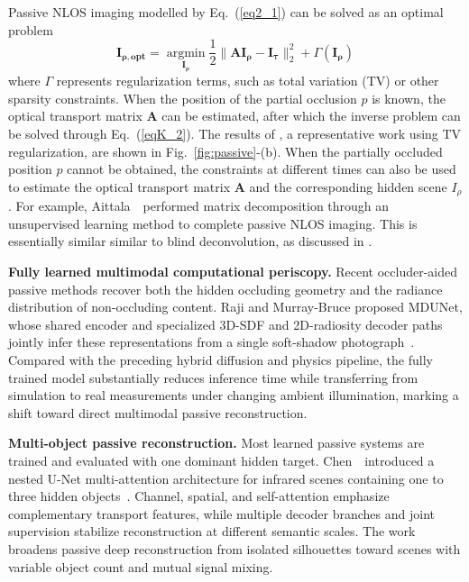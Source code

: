 Passive NLOS imaging modelled by Eq.~(\ref{eq2_1}) can be solved as an optimal problem
\begin{equation}
\mathbf{I_{\rho,opt}}=\underset{\mathbf{I_{\rho}}}{\operatorname{argmin}} \frac{1}{2}\|\mathbf{A} \mathbf{I_{\rho}} -\mathbf{I_{\tau}}\|_{2}^{2}+\Gamma(\mathbf{I_{\rho}})
\label{eqK_2}
\end{equation}
where $\Gamma$ represents regularization terms, such as total variation (TV) or other sparsity constraints. When the position of the partial occlusion $p$ is known, the optical transport matrix $\mathbf{A}$ can be estimated, after which the inverse problem can be solved through Eq.~(\ref{eqK_2}). The results of \cite{saundersComputationalPeriscopyOrdinary2019}, a representative work using TV regularization, are shown in Fig.~\ref{fig:passive}-(b).
When the partially occluded position $p$ cannot be obtained, the constraints at different times can also be used to estimate the optical transport matrix $\mathbf{A}$ and the corresponding hidden scene $I_{\rho}$. For example, Aittala~\etal~performed matrix decomposition through an unsupervised learning method to complete passive NLOS imaging\cite{aittalaComputationalMirrorsBlind2019}. This is essentially similar similar to blind deconvolution\cite{chanTotalVariationBlind1998,kundurBlindImageDeconvolution1996,levinUnderstandingEvaluatingBlind2009}, as discussed in \cite{yedidiaUsingUnknownOccluders2019}.

\vspace{0.8mm}
\noindent \textbf{Fully learned multimodal computational periscopy.}
Recent occluder-aided passive methods recover both the hidden occluding geometry and the radiance distribution of non-occluding content. Raji and Murray-Bruce proposed MDUNet, whose shared encoder and specialized 3D-SDF and 2D-radiosity decoder paths jointly infer these representations from a single soft-shadow photograph~\cite{rajiMDUNet2026}. Compared with the preceding hybrid diffusion and physics pipeline, the fully trained model substantially reduces inference time while transferring from simulation to real measurements under changing ambient illumination, marking a shift toward direct multimodal passive reconstruction.

\vspace{0.8mm}
\noindent \textbf{Multi-object passive reconstruction.}
Most learned passive systems are trained and evaluated with one dominant hidden target. Chen~\etal~introduced a nested U-Net multi-attention architecture for infrared scenes containing one to three hidden objects~\cite{chenMultipleObjectPassiveNLOS2026}. Channel, spatial, and self-attention emphasize complementary transport features, while multiple decoder branches and joint supervision stabilize reconstruction at different semantic scales. The work broadens passive deep reconstruction from isolated silhouettes toward scenes with variable object count and mutual signal mixing.

